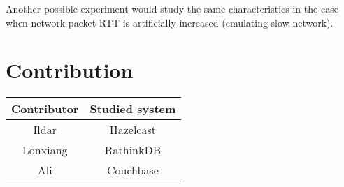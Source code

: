 \documentclass[a4paper]{article}
\begin{document}
Another possible experiment would study the same characteristics in the case when network packet RTT is artificially increased (emulating slow network).  

\section*{Contribution}

\begin{table}[hb]
	\centering
	\begin{tabular}{|c|c|}
		\hline
		\rowcolor{light-gray} \textbf{Contributor} & \textbf{Studied system} \\ \hline
		Ildar & Hazelcast  \\ \hline
		Lonxiang & RathinkDB  \\ \hline
		Ali & Couchbase  \\ \hline
	\end{tabular}
\end{table}
\end{document}
